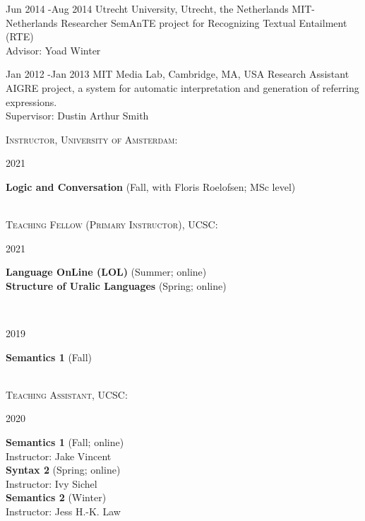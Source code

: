 \documentclass[12pt]{article} %
\begin{document}
\job
{Jun 2014 -}{Aug 2014}
{Utrecht University, Utrecht, the Netherlands}
{}
{MIT-Netherlands Researcher}
{SemAnTE project for Recognizing Textual Entailment (RTE)\\
Advisor: Yoad Winter}

\job
{Jan 2012 -}{Jan 2013}
{MIT Media Lab, Cambridge, MA, USA}
{}
{Research Assistant}
{AIGRE project, a system for automatic interpretation and generation of referring expressions.\\Supervisor: Dustin Arthur Smith\textsuperscript{\textdagger}}


\textsc{Instructor, University of Amsterdam}:\\

\begin{minipage}[t]{3cm}
	2021
\end{minipage}
\begin{minipage}[t]{\smallertextwidth} \textbf{Logic and Conversation} (Fall, with Floris Roelofsen; MSc level)\end{minipage}\\



\textsc{Teaching Fellow ({Primary Instructor}), UCSC:}\\



\begin{minipage}[t]{3cm}
	2021
\end{minipage}
\begin{minipage}[t]{\smallertextwidth} \textbf{Language OnLine (LOL)} (Summer; online)\\ \textbf{Structure of Uralic Languages} (Spring; online)\end{minipage}\\

\vspace{0.08cm}

\begin{minipage}[t]{3cm}
2019
\end{minipage}
\begin{minipage}[t]{\smallertextwidth} \textbf{Semantics 1} (Fall)\end{minipage}\\



\textsc{Teaching Assistant, UCSC:}\\

\begin{minipage}[t]{3cm}
2020
\end{minipage}
\begin{minipage}[t] {\smallertextwidth} \textbf{Semantics 1} (Fall; online)\\Instructor: Jake Vincent\\\textbf{Syntax 2} (Spring; online)\\Instructor: Ivy Sichel\\\textbf{Semantics 2} (Winter)\\Instructor: Jess H.-K. Law\end{minipage}\\
\end{document}
